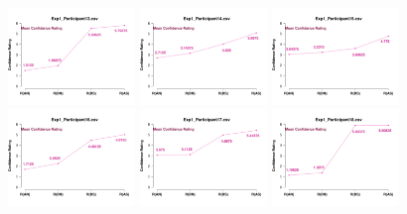 \begin{figure}[th]
\includegraphics[width=0.30\textwidth]{Figures/MirrorRating_Exp1_P13} \includegraphics[width=0.30\textwidth]{Figures/MirrorRating_Exp1_P14} \includegraphics[width=0.30\textwidth]{Figures/MirrorRating_Exp1_P15}
\includegraphics[width=0.30\textwidth]{Figures/MirrorRating_Exp1_P16} \includegraphics[width=0.30\textwidth]{Figures/MirrorRating_Exp1_P17} \includegraphics[width=0.30\textwidth]{Figures/MirrorRating_Exp1_P18}

\end{figure}
